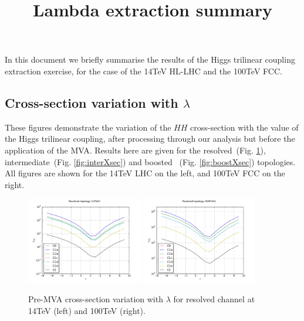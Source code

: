 \documentclass[11pt]{article}
\title{Lambda extraction summary}
\begin{document}
\maketitle

In this document we briefly summarise the results of the Higgs trilinear coupling extraction exercise, for the case of the 14TeV HL-LHC and
the 100TeV FCC.
\subsection{Cross-section variation with $\lambda$}
These figures demonstrate the variation of the $HH$ cross-section with the value of the Higgs trilinear coupling, after processing through our analysis
but before the application of the MVA. Results here are given for the resolved~(Fig. \ref{fig:resXsec}), intermediate~(Fig. \ref{fig:interXsec}) and boosted ~(Fig. \ref{fig:boostXsec}) topologies. All figures are shown for the 14TeV LHC on the left, and 100TeV FCC on the right.

\begin{figure}[htbp]
\begin{center}
\includegraphics[width=0.45\textwidth]{plots/res_xSec_14TeV.pdf}
\includegraphics[width=0.45\textwidth]{plots/res_xSec_100TeV.pdf}
\caption{Pre-MVA cross-section variation with $\lambda$ for resolved channel at 14TeV (left) and 100TeV (right).}
\label{fig:resXsec}
\end{center}
\end{figure}
\end{document}
